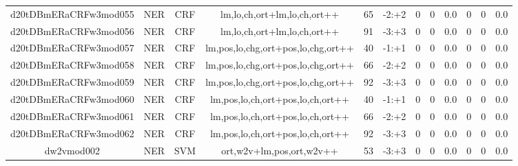 \documentclass[a4paper]{article}
\begin{document}
\begin{landscape}
\begin{center}
\begin{tabular}{ |c|c|c|c|c|c|c|c|c|c|c|c|}
 
 	
 	\small{ d20tDBmERaCRFw3mod055 } & \small{ NER} & \small{  CRF }  & lm,lo,ch,ort+lm,lo,ch,ort++  &  65 &  \small{  -2:+2 }  &  0 & 0 & 0.0  &  0 & 0 & 0.0 \\
 	

 
 	
 	\small{ d20tDBmERaCRFw3mod056 } & \small{ NER} & \small{  CRF }  & lm,lo,ch,ort+lm,lo,ch,ort++  &  91 &  \small{  -3:+3 }  &  0 & 0 & 0.0  &  0 & 0 & 0.0 \\
 	

 
 	
 	\small{ d20tDBmERaCRFw3mod057 } & \small{ NER} & \small{  CRF }  & lm,pos,lo,chg,ort+pos,lo,chg,ort++  &  40 &  \small{  -1:+1 }  &  0 & 0 & 0.0  &  0 & 0 & 0.0 \\
 	

 
 	
 	\small{ d20tDBmERaCRFw3mod058 } & \small{ NER} & \small{  CRF }  & lm,pos,lo,chg,ort+pos,lo,chg,ort++  &  66 &  \small{  -2:+2 }  &  0 & 0 & 0.0  &  0 & 0 & 0.0 \\
 	

 
 	
 	\small{ d20tDBmERaCRFw3mod059 } & \small{ NER} & \small{  CRF }  & lm,pos,lo,chg,ort+pos,lo,chg,ort++  &  92 &  \small{  -3:+3 }  &  0 & 0 & 0.0  &  0 & 0 & 0.0 \\
 	

 
 	
 	\small{ d20tDBmERaCRFw3mod060 } & \small{ NER} & \small{  CRF }  & lm,pos,lo,ch,ort+pos,lo,ch,ort++  &  40 &  \small{  -1:+1 }  &  0 & 0 & 0.0  &  0 & 0 & 0.0 \\
 	

 
 	
 	\small{ d20tDBmERaCRFw3mod061 } & \small{ NER} & \small{  CRF }  & lm,pos,lo,ch,ort+pos,lo,ch,ort++  &  66 &  \small{  -2:+2 }  &  0 & 0 & 0.0  &  0 & 0 & 0.0 \\
 	

 
 	
 	\small{ d20tDBmERaCRFw3mod062 } & \small{ NER} & \small{  CRF }  & lm,pos,lo,ch,ort+pos,lo,ch,ort++  &  92 &  \small{  -3:+3 }  &  0 & 0 & 0.0  &  0 & 0 & 0.0 \\
 	

 
 	
 	\small{ dw2vmod002 } & \small{ NER} & \small{  SVM }  & ort,w2v+lm,pos,ort,w2v++  &  53 &  \small{  -3:+3 }  &  0 & 0 & 0.0  &  0 & 0 & 0.0 \\
 	


\end{tabular}
\end{center}
\end{landscape}
\end{document}

